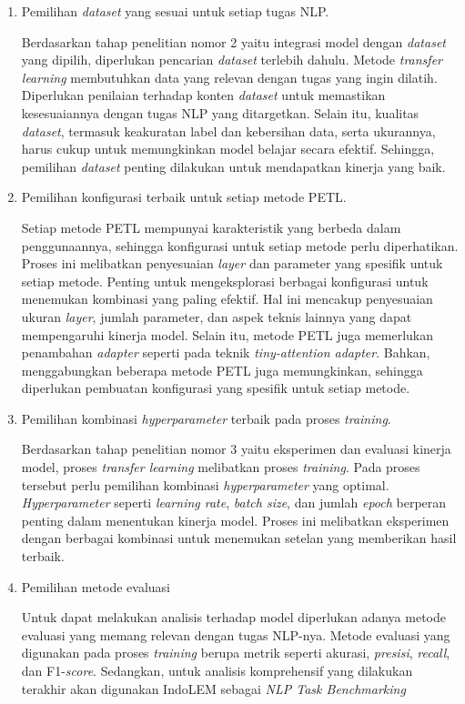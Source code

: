 \begin{enumerate}
    \item Pemilihan \textit{dataset} yang sesuai untuk setiap tugas NLP.
    
    Berdasarkan tahap penelitian nomor 2 yaitu integrasi model dengan \textit{dataset} yang dipilih, diperlukan pencarian \textit{dataset} terlebih dahulu. Metode \textit{transfer learning} membutuhkan data yang relevan dengan tugas yang ingin dilatih. Diperlukan penilaian terhadap konten \textit{dataset} untuk memastikan kesesuaiannya dengan tugas NLP yang ditargetkan. Selain itu, kualitas \textit{dataset}, termasuk keakuratan label dan kebersihan data, serta ukurannya, harus cukup untuk memungkinkan model belajar secara efektif. Sehingga, pemilihan \textit{dataset} penting dilakukan untuk mendapatkan kinerja yang baik.

    \item Pemilihan konfigurasi terbaik untuk setiap metode PETL.
    
    Setiap metode PETL mempunyai karakteristik yang berbeda dalam penggunaannya, sehingga konfigurasi untuk setiap metode perlu diperhatikan. Proses ini melibatkan penyesuaian \textit{layer} dan parameter yang spesifik untuk setiap metode. Penting untuk mengeksplorasi berbagai konfigurasi untuk menemukan kombinasi yang paling efektif. Hal ini mencakup penyesuaian ukuran \textit{layer}, jumlah parameter, dan aspek teknis lainnya yang dapat mempengaruhi kinerja model. Selain itu, metode PETL juga memerlukan penambahan \textit{adapter} seperti pada teknik \textit{tiny-attention adapter}. Bahkan, menggabungkan beberapa metode PETL juga memungkinkan, sehingga diperlukan pembuatan konfigurasi yang spesifik untuk setiap metode.


    \item Pemilihan kombinasi \textit{hyperparameter} terbaik pada proses \textit{training}.
    
    Berdasarkan tahap penelitian nomor 3 yaitu eksperimen dan evaluasi kinerja model, proses \textit{transfer learning} melibatkan proses \textit{training}. Pada proses tersebut perlu pemilihan kombinasi \textit{hyperparameter} yang optimal. \textit{Hyperparameter} seperti \textit{learning rate}, \textit{batch size}, dan jumlah \textit{epoch} berperan penting dalam menentukan kinerja model. Proses ini melibatkan eksperimen dengan berbagai kombinasi untuk menemukan setelan yang memberikan hasil terbaik. 
    
    \item Pemilihan metode evaluasi
    
    Untuk dapat melakukan analisis terhadap model diperlukan adanya metode evaluasi yang memang relevan dengan tugas NLP-nya. Metode evaluasi yang digunakan pada proses \textit{training} berupa metrik seperti akurasi, \textit{presisi}, \textit{recall}, dan F1-\textit{score}. Sedangkan, untuk analisis komprehensif yang dilakukan terakhir akan digunakan IndoLEM sebagai \textit{NLP Task Benchmarking}

\end{enumerate}